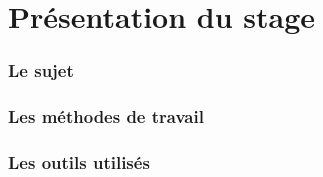 \chapter{Présentation du stage}

\subsection{Le sujet}

\subsection{Les méthodes de travail}

\subsection{Les outils utilisés}